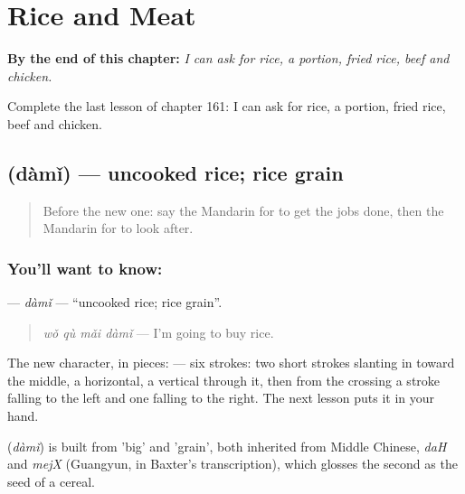 
\chapter{Rice and Meat}
\label{ch:zh-rice-and-meat}

\begin{chapteropening}
\textbf{By the end of this chapter:} \emph{I can ask for rice, a portion, fried rice, beef and chicken.}

Complete the last lesson of chapter 161: I can ask for rice, a portion, fried rice, beef and chicken.
\end{chapteropening}

\section[\texorpdfstring{\zh{大米} (dàmǐ)}{大米 (dàmǐ)}]{ (dàmǐ) — uncooked rice; rice grain}

\label{lesson:ZH-C161-dami}



\begin{quote}
Before the new one: say the Mandarin for to get the jobs done, then the Mandarin for to look after.
\end{quote}

\subsection*{You'll want to know: }
\textbf{} — \emph{dàmǐ} — \textquotedblleft{}uncooked rice; rice grain\textquotedblright{}.

\begin{quote}
\textbf{} \emph{wǒ qù mǎi dàmǐ} — I'm going to buy rice.
\end{quote}

The new character, in pieces:  — six strokes: two short strokes slanting in toward the middle, a horizontal, a vertical through it, then from the crossing a stroke falling to the left and one falling to the right. The next lesson puts it in your hand.

\begin{cousinweb}
\textbf{} (\emph{dàmǐ}) is built from  'big' and  'grain', both inherited from Middle Chinese, \emph{daH} and \emph{mejX} (Guangyun, in Baxter's transcription), which glosses the second as the seed of a cereal.
\end{cousinweb}

